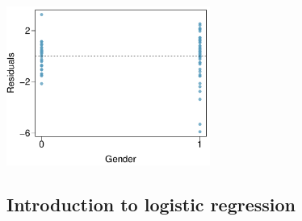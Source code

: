 {\begin{center}
\includegraphics[width=0.5\textwidth]{ch_regr_mult_and_log/figures/eoce/gpa_iq_conds/gpa_iq_conds_res_gender.pdf} 
\end{center}
}{}

\textC{\newpage}

\subsection{Introduction to logistic regression}


